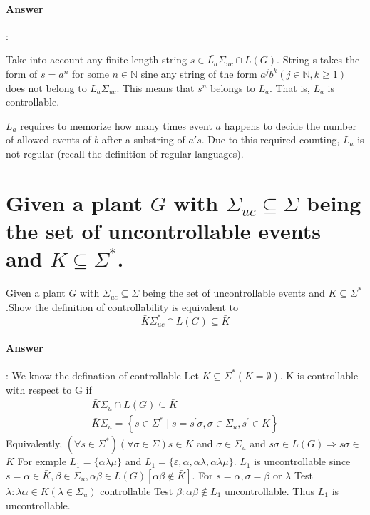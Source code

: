 \documentclass{article}
\begin{document}
\paragraph{Answer}:

Take into account any finite length string $s \in \bar{L_a}\Sigma_{uc} \cap L(G)$. String s takes the form of $s = a^n$ for some $n \in \mathbb{N}$ sine any string of the form $a^jb^k(j \in \mathbb{N}, k \geq 1)$ does not belong to $\bar{L_a}\Sigma_{uc}$. This means that $s^n$ belongs to $\bar{L_a}$. That is, $L_a$ is controllable.

$L_a$ requires to memorize how many times event $a$ happens to decide the number of allowed events of $b$ after a substring of $a\prime s$. Due to this required counting, $L_a$ is not regular (recall the definition of regular languages).

\section{Given a plant $G$ with $\Sigma_{u c} \subseteq \Sigma$ being the set of uncontrollable events and $K \subseteq \Sigma^*$.}
 
Given a plant $G$ with $\Sigma_{u c} \subseteq \Sigma$ being the set of uncontrollable events and $K \subseteq \Sigma^*$.Show the definition of controllability is equivalent to
$$
\bar{K} \Sigma_{u c}^* \cap L(G) \subseteq \bar{K}
$$

\paragraph{Answer}:
We know the defination of controllable Let $K \subseteq \Sigma^*(K=\emptyset)$. K is controllable with respect to $\mathrm{G}$ if
$$
\begin{array}{r}
\bar{K} \Sigma_u \cap L(G) \subseteq \bar{K} \\
\bar{K} \Sigma_u=\left\{s \in \Sigma^* \mid s=s^{\prime} \sigma, \sigma \in \Sigma_u, s^{\prime} \in K\right\}
\end{array}
$$
Equivalently, $\left(\forall s \in \Sigma^*\right)(\forall \sigma \in \Sigma) s \in K$ and $\sigma \in \Sigma_u$ and $s \sigma \in L(G) \Rightarrow s \sigma \in$
$K$
For exmple $L_1=\{\alpha \lambda \mu\}$ and $\overline{L_1}=\{\varepsilon, \alpha, \alpha \lambda, \alpha \lambda \mu\}$. $L_1$ is uncontrollable since $s=\alpha \in \bar{K}, \beta \in \Sigma_u, \alpha \beta \in L(G)[\alpha \beta \notin \bar{K}]$. For $s=\alpha, \sigma=\beta$ or $\lambda$
Test $\lambda: \lambda \alpha \in K\left(\lambda \in \Sigma_u\right)$ controllable
Test $\beta: \alpha \beta \notin L_1$ uncontrollable. Thus $L_1$ is uncontrollable.
\end{document}
